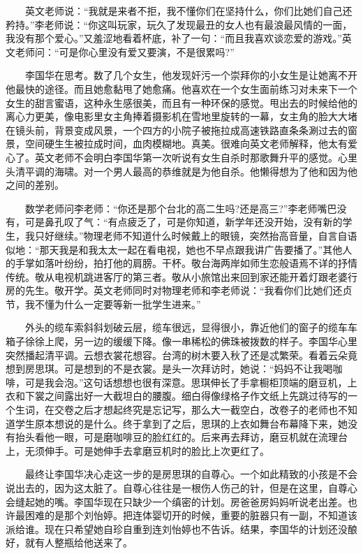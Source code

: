 \documentclass[12pt,UTF8]{ctexbook}
\begin{document}
　　英文老师说：\enquote{我就是来者不拒，我不懂你们在坚持什么，你们比她们自己还矜持。}李老师说：\enquote{你这叫玩家，玩久了发现最丑的女人也有最浪最风情的一面，我没有那个爱心。}又羞涩地看着杯底，补了一句：\enquote{而且我喜欢谈恋爱的游戏。}英文老师问：\enquote{可是你心里没有爱又要演，不是很累吗?}

　　李国华在思考。数了几个女生，他发现奸污一个崇拜你的小女生是让她离不开他最快的途径。而且她愈黏甩了她愈痛。他喜欢在一个女生面前练习对未来下一个女生的甜言蜜语，这种永生感很美，而且有一种环保的感觉。甩出去的时候给他的离心力更美，像电影里女主角捧着摄影机在雪地里旋转的一幕，女主角的脸大大堵在镜头前，背景变成风景，一个四方的小院子被拖拉成高速铁路直条条涮过去的窗景，空间硬生生被拉成时间，血肉模糊地。真美。很难向英文老师解释，他太有爱心了。英文老师不会明白李国华第一次听说有女生自杀时那歌舞升平的感觉。心里头清平调的海啸。对一个男人最高的恭维就是为他自杀。他懒得想为了他和因为他之间的差别。

　　数学老师问李老师：\enquote{你还是那个台北的高二生吗?还是高三?}李老师嘴巴没有，可是鼻孔叹了气：\enquote{有点疲乏了，可是你知道，新学年还没开始，没有新的学生，我只好继续。}物理老师不知道什么时候戴上的眼镜，突然抬高音量，自言自语似地：\enquote{那天我是和我太太一起在看电视，她也不早点跟我讲广告要播了。}其他人的手掌如落叶纷纷，拍打他的肩膀。干杯。敬台海两岸如师生恋般语焉不详的抒情传统。敬从电视机跳进客厅的第三者。敬从小旅馆出来回到家还能开着灯跟老婆行房的先生。敬开学。英文老师同时对物理老师和李老师说：\enquote{我看你们比她们还贞节，我不懂为什么一定要等新一批学生进来。}

　　外头的缆车索斜斜划破云层，缆车很远，显得很小，靠近他们的窗子的缆车车箱子徐徐上爬，另一边的缓缓下降。像一串稀松的佛珠被拨数的样子。李国华心里突然播起清平调。云想衣裳花想容。台湾的树木要入秋了还是忒繁荣。看着云朵竟想到房思琪。可是想到的不是衣裳。是头一次拜访时，她说：\enquote{妈妈不让我喝咖啡，可是我会泡。}这句话想想也很有深意。思琪伸长了手拿橱柜顶端的磨豆机，上衣和下裳之间露出好一大截坦白的腰腹。细白得像绿格子作文纸上先跳过待写的一个生词，在交卷之后才想起终究是忘记写，那么大一截空白，改卷子的老师也不知道学生原本想说的是什么。终于拿到了之后，思琪的上衣如舞台布幕降下来，她没有抬头看他一眼，可是磨咖啡豆的脸红红的。后来再去拜访，磨豆机就在流理台上，无须伸手。可是她伸手去拿磨豆机时的脸比上次更红了。

　　最终让李国华决心走这一步的是房思琪的自尊心。一个如此精致的小孩是不会说出去的，因为这太脏了。自尊心往往是一根伤人伤己的针，但是在这里，自尊心会缝起她的嘴。李国华现在只缺少一个缜密的计划。房爸爸房妈妈听说老出差。也许最困难的是那个刘怡婷。把连体婴切开的时候，重要的脏器只有一副，不知道该派给谁。现在只希望她自珍自重到连刘怡婷也不告诉。结果，李国华的计划还没酿好，就有人整瓶给他送来了。
\end{document}
